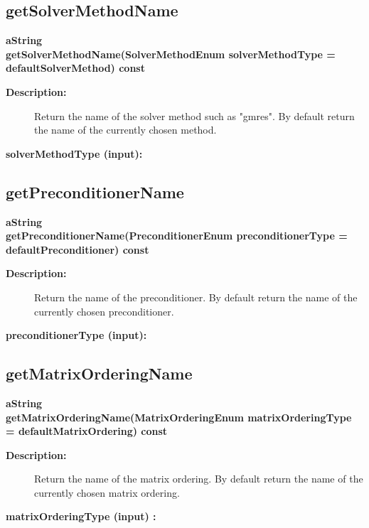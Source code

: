 \subsection{getSolverMethodName}
 
\begin{flushleft} \textbf{%
aString  \\ 
\settowidth{\OgesParametersIncludeArgIndent}{getSolverMethodName(}%
getSolverMethodName(SolverMethodEnum solverMethodType  = defaultSolverMethod) const
}\end{flushleft}
\begin{description}
\item[{\bf Description:}] 
   Return the name of the solver method such as "gmres".
 By default return the name of the currently chosen method.
\item[{\bf solverMethodType (input):}] 
\end{description}
\subsection{getPreconditionerName}
 
\begin{flushleft} \textbf{%
aString  \\ 
\settowidth{\OgesParametersIncludeArgIndent}{getPreconditionerName(}%
getPreconditionerName(PreconditionerEnum preconditionerType   = defaultPreconditioner) const
}\end{flushleft}
\begin{description}
\item[{\bf Description:}] 
   Return the name of the preconditioner. By default return the name of the currently
 chosen preconditioner.
\item[{\bf preconditionerType (input):}] 
\end{description}
\subsection{getMatrixOrderingName}
 
\begin{flushleft} \textbf{%
aString  \\ 
\settowidth{\OgesParametersIncludeArgIndent}{getMatrixOrderingName(}%
getMatrixOrderingName(MatrixOrderingEnum matrixOrderingType  = defaultMatrixOrdering) const
}\end{flushleft}
\begin{description}
\item[{\bf Description:}] 
   Return the name of the matrix ordering. By default return the name of the
 currently chosen matrix ordering.
\item[{\bf matrixOrderingType (input) :}] 
\end{description}
